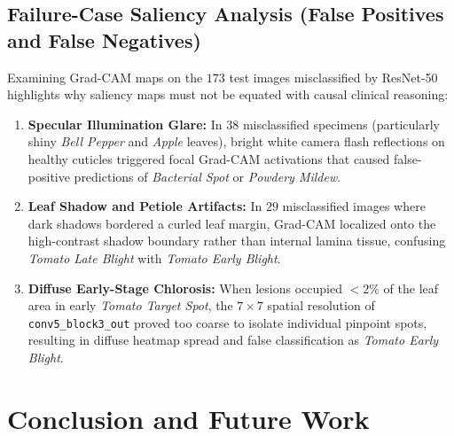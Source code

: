 \documentclass[journal]{IEEEtran}
\begin{document}
\subsection{Failure-Case Saliency Analysis (False Positives and False Negatives)}
Examining Grad-CAM maps on the $173$ test images misclassified by ResNet-50 highlights why saliency maps must not be equated with causal clinical reasoning:
\begin{enumerate}
    \item \textbf{Specular Illumination Glare:} In $38$ misclassified specimens (particularly shiny \textit{Bell Pepper} and \textit{Apple} leaves), bright white camera flash reflections on healthy cuticles triggered focal Grad-CAM activations that caused false-positive predictions of \textit{Bacterial Spot} or \textit{Powdery Mildew}.
    \item \textbf{Leaf Shadow and Petiole Artifacts:} In $29$ misclassified images where dark shadows bordered a curled leaf margin, Grad-CAM localized onto the high-contrast shadow boundary rather than internal lamina tissue, confusing \textit{Tomato Late Blight} with \textit{Tomato Early Blight}.
    \item \textbf{Diffuse Early-Stage Chlorosis:} When lesions occupied $<2\%$ of the leaf area in early \textit{Tomato Target Spot}, the $7 \times 7$ spatial resolution of \texttt{conv5\_block3\_out} proved too coarse to isolate individual pinpoint spots, resulting in diffuse heatmap spread and false classification as \textit{Tomato Early Blight}.
\end{enumerate}

\section{Conclusion and Future Work}
\end{document}
